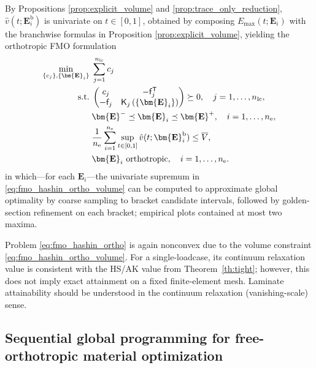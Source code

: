 \documentclass[preprint,3p]{elsarticle}
\newcommand{\tensf}[1]{\bm{\mathbf{#1}}}            %
\newcommand{\trn}{\mathsf{T}}                       %
\newcommand{\Ei}{\tensf{E}_i}                       %
\newcommand{\Emin}{\tensf{E}^{-}}                   %
\newcommand{\Emax}{\tensf{E}^{+}}                   %
\newcommand{\nel}{n_\mathrm{e}}                     %
\newcommand{\nlc}{n_\mathrm{lc}}                    %
\newcommand{\semtrx}[1]{\ifcat\noexpand#1\relax\bm{#1}\else\mathsf{#1}\fi}
\newcommand{\sevek}[1]{\ifcat\noexpand#1\relax\bm{#1}\else\mathsf{#1}\fi}
\begin{document}
By Propositions \ref{prop:explicit_volume} and \ref{prop:trace_only_reduction}, $\hat{v}(t;\Ei^{\mathrm{b}})$ is univariate on $t\in[0,1]$, obtained by composing $E_{\max}(t;\Ei)$ with the branchwise formulas in Proposition \ref{prop:explicit_volume}, yielding the orthotropic FMO formulation
%
\begin{subequations}\label{eq:fmo_hashin_ortho}
\begin{align}
    \min_{\{c_j\}, \{\Ei\}} \; & \sum_{j=1}^{\nlc} c_j \label{eq:fmo_hashin_ortho_compliance}\\
    \mathrm{s.t.}\; & \begin{pmatrix}
        c_j & -\sevek{f}_j^\trn\\
        -\sevek{f}_j & \semtrx{K}_j\left(\{\Ei\}\right)
    \end{pmatrix}\succeq 0, \quad j = 1,\dots,\nlc,\label{eq:fmo_hashin_ortho_lmi}\\
    & \Emin \preceq \Ei \preceq \Emax,\quad i = 1,\dots,\nel,\label{eq:fmo_hashin_ortho_bounds}\\
    & \frac{1}{\nel}\sum_{i=1}^{\nel} \sup_{t \in [0,1]} \hat{v}(t;\Ei^{\mathrm{b}}) \le \overline{V},\label{eq:fmo_hashin_ortho_volume}\\
    & \tensf{E}_i \text{ orthotropic},\quad i = 1,\dots,\nel.\label{eq:fmo_hashin_ortho_ortho}
\end{align}
\end{subequations}
%
in which---for each $\Ei$---the univariate supremum in \eqref{eq:fmo_hashin_ortho_volume} can be computed to approximate global optimality by coarse sampling to bracket candidate intervals, followed by golden-section refinement on each bracket; empirical plots contained at most two maxima.

Problem \eqref{eq:fmo_hashin_ortho} is again nonconvex due to the volume constraint \eqref{eq:fmo_hashin_ortho_volume}. For a single-loadcase, its continuum relaxation value is consistent with the HS/AK value from Theorem~\ref{th:tight}; however, this does not imply exact attainment on a fixed finite-element mesh. Laminate attainability should be understood in the continuum relaxation (vanishing-scale) sense.

\subsection{Sequential global programming for free-orthotropic material optimization}\label{sec:sgp}
\end{document}
